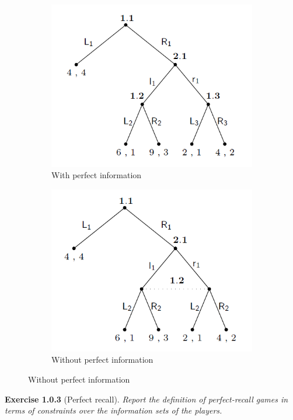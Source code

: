 \begin{figure}[H]
\begin{subfigure}[t]{0.45\textwidth}
 \includegraphics[width=\textwidth]{images/img_1_1_01.png}
 \caption{With perfect information}
\end{subfigure}
\begin{subfigure}[t]{0.45\textwidth}
 \includegraphics[width=\textwidth]{images/img_1_1_02.png}
 \caption{Without perfect information}
\end{subfigure}
\end{figure}
\noindent
\textbf{Exercise 1.0.3} (Perfect recall). \textit{Report the definition of perfect-recall games in terms of constraints over the
information sets of the players.}\\\\
